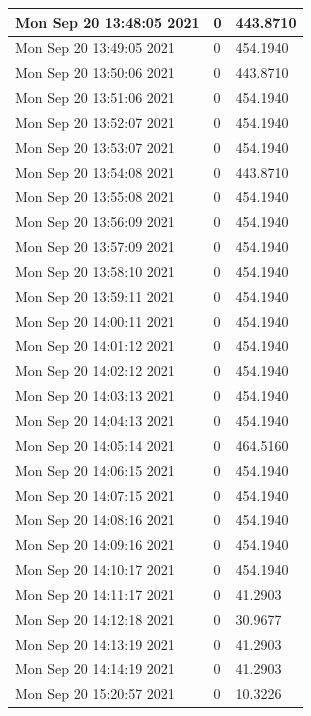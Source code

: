\begin{longtable}{|l|l|l|}
Mon Sep 20 13:48:05 2021 &                  0 &        443.8710 \\ \hline
Mon Sep 20 13:49:05 2021 &                  0 &        454.1940 \\ \hline
Mon Sep 20 13:50:06 2021 &                  0 &        443.8710 \\ \hline
Mon Sep 20 13:51:06 2021 &                  0 &        454.1940 \\ \hline
Mon Sep 20 13:52:07 2021 &                  0 &        454.1940 \\ \hline
Mon Sep 20 13:53:07 2021 &                  0 &        454.1940 \\ \hline
Mon Sep 20 13:54:08 2021 &                  0 &        443.8710 \\ \hline
Mon Sep 20 13:55:08 2021 &                  0 &        454.1940 \\ \hline
Mon Sep 20 13:56:09 2021 &                  0 &        454.1940 \\ \hline
Mon Sep 20 13:57:09 2021 &                  0 &        454.1940 \\ \hline
Mon Sep 20 13:58:10 2021 &                  0 &        454.1940 \\ \hline
Mon Sep 20 13:59:11 2021 &                  0 &        454.1940 \\ \hline
Mon Sep 20 14:00:11 2021 &                  0 &        454.1940 \\ \hline
Mon Sep 20 14:01:12 2021 &                  0 &        454.1940 \\ \hline
Mon Sep 20 14:02:12 2021 &                  0 &        454.1940 \\ \hline
Mon Sep 20 14:03:13 2021 &                  0 &        454.1940 \\ \hline
Mon Sep 20 14:04:13 2021 &                  0 &        454.1940 \\ \hline
Mon Sep 20 14:05:14 2021 &                  0 &        464.5160 \\ \hline
Mon Sep 20 14:06:15 2021 &                  0 &        454.1940 \\ \hline
Mon Sep 20 14:07:15 2021 &                  0 &        454.1940 \\ \hline
Mon Sep 20 14:08:16 2021 &                  0 &        454.1940 \\ \hline
Mon Sep 20 14:09:16 2021 &                  0 &        454.1940 \\ \hline
Mon Sep 20 14:10:17 2021 &                  0 &        454.1940 \\ \hline
Mon Sep 20 14:11:17 2021 &                  0 &         41.2903 \\ \hline
Mon Sep 20 14:12:18 2021 &                  0 &         30.9677 \\ \hline
Mon Sep 20 14:13:19 2021 &                  0 &         41.2903 \\ \hline
Mon Sep 20 14:14:19 2021 &                  0 &         41.2903 \\ \hline
Mon Sep 20 15:20:57 2021 &                  0 &         10.3226 \\ \hline
\end{longtable}

